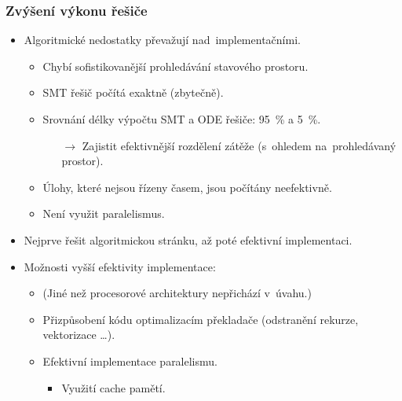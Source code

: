 \documentclass[t]{beamer}
\begin{document}
\begin{frame}\frametitle{Zvýšení výkonu řešiče}
\begin{itemize}
\item Algoritmické nedostatky převažují nad~implementačními.
   \begin{itemize}
   \item Chybí sofistikovanější prohledávání stavového prostoru.
   \item SMT řešič počítá exaktně (zbytečně).
   \item Srovnání délky výpočtu SMT a ODE řešiče: 95~\% a 5~\%.
      \begin{itemize}
      \item[$\rightarrow$] Zajistit efektivnější rozdělení zátěže
         (s~ohledem na~prohledávaný prostor).
      \end{itemize}
   \item Úlohy, které nejsou řízeny časem, jsou počítány neefektivně.
   \item Není využit paralelismus.
   \end{itemize}
\item Nejprve řešit algoritmickou stránku, až poté efektivní implementaci.
\item Možnosti vyšší efektivity implementace:
   \begin{itemize}
   \item (Jiné než procesorové architektury nepřichází v~úvahu.)
   \item Přizpůsobení kódu optimalizacím překladače
      (odstranění rekurze, vektorizace \dots).
   \item Efektivní implementace paralelismu.
      \begin{itemize}
      \item Využití cache pamětí.
      \end{itemize}
   \end{itemize}
\end{itemize}
\end{frame}

\setcounter{framenumber}{\value{finalframe}}

\end{document}
